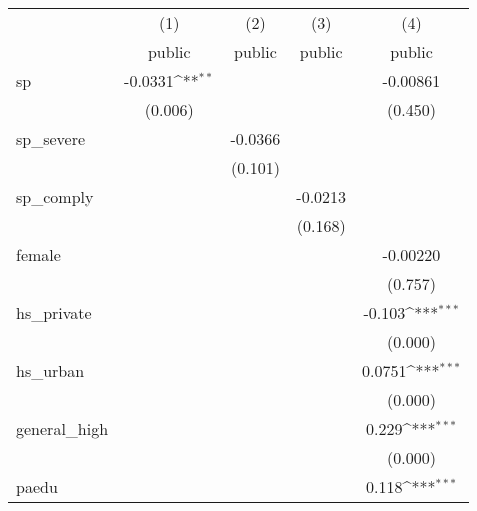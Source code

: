 {
\def\sym#1{\ifmmode^{#1}\else\(^{#1}\)\fi}
\begin{tabular}{l*{4}{c}}
\hline\hline
            &\multicolumn{1}{c}{(1)}&\multicolumn{1}{c}{(2)}&\multicolumn{1}{c}{(3)}&\multicolumn{1}{c}{(4)}\\
            &\multicolumn{1}{c}{public}&\multicolumn{1}{c}{public}&\multicolumn{1}{c}{public}&\multicolumn{1}{c}{public}\\
\hline
sp          &     -0.0331\sym{**} &                     &                     &    -0.00861         \\
            &     (0.006)         &                     &                     &     (0.450)         \\
[1em]
sp\_severe   &                     &     -0.0366         &                     &                     \\
            &                     &     (0.101)         &                     &                     \\
[1em]
sp\_comply   &                     &                     &     -0.0213         &                     \\
            &                     &                     &     (0.168)         &                     \\
[1em]
female      &                     &                     &                     &    -0.00220         \\
            &                     &                     &                     &     (0.757)         \\
[1em]
hs\_private  &                     &                     &                     &      -0.103\sym{***}\\
            &                     &                     &                     &     (0.000)         \\
[1em]
hs\_urban    &                     &                     &                     &      0.0751\sym{***}\\
            &                     &                     &                     &     (0.000)         \\
[1em]
general\_high&                     &                     &                     &       0.229\sym{***}\\
            &                     &                     &                     &     (0.000)         \\
[1em]
paedu       &                     &                     &                     &       0.118\sym{***}\\

\end{tabular}}
